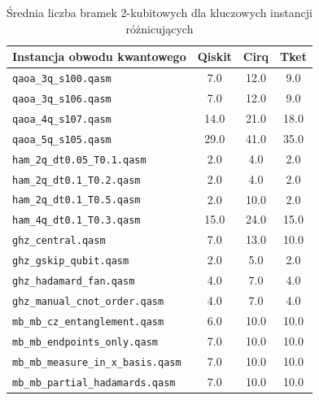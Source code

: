 \begin{table}[t]
    \centering
    \caption{Średnia liczba bramek 2-kubitowych dla kluczowych instancji różnicujących}
    \label{table:anomalies_gate}
    \begin{tabular}{l@{\hspace{8pt}}c@{\hspace{8pt}}c@{\hspace{8pt}}c}
        \toprule
        \textbf{Instancja obwodu kwantowego} & \textbf{Qiskit} & \textbf{Cirq} & \textbf{Tket} \\
        \midrule
        \texttt{qaoa\_3q\_s100.qasm} & {7.0} & {12.0} & {9.0} \\
        \texttt{qaoa\_3q\_s106.qasm} & {7.0} & {12.0} & {9.0} \\
        \texttt{qaoa\_4q\_s107.qasm} & {14.0} & {21.0} & {18.0} \\
        \texttt{qaoa\_5q\_s105.qasm} & {29.0} & {41.0} & {35.0} \\
        \texttt{ham\_2q\_dt0.05\_T0.1.qasm} & {2.0} & {4.0} & {2.0} \\
        \texttt{ham\_2q\_dt0.1\_T0.2.qasm} & {2.0} & {4.0} & {2.0} \\
        \texttt{ham\_2q\_dt0.1\_T0.5.qasm} & {2.0} & {10.0} & {2.0} \\
        \texttt{ham\_4q\_dt0.1\_T0.3.qasm} & {15.0} & {24.0} & {15.0} \\
        \texttt{ghz\_central.qasm} & {7.0} & {13.0} & {10.0} \\
        \texttt{ghz\_gskip\_qubit.qasm} & {2.0} & {5.0} & {2.0} \\
        \texttt{ghz\_hadamard\_fan.qasm} & {4.0} & {7.0} & {4.0} \\
        \texttt{ghz\_manual\_cnot\_order.qasm} & {4.0} & {7.0} & {4.0} \\
        \texttt{mb\_mb\_cz\_entanglement.qasm} & {6.0} & {10.0} & {10.0} \\
        \texttt{mb\_mb\_endpoints\_only.qasm} & {7.0} & {10.0} & {10.0} \\
        \texttt{mb\_mb\_measure\_in\_x\_basis.qasm} & {7.0} & {10.0} & {10.0} \\
        \texttt{mb\_mb\_partial\_hadamards.qasm} & {7.0} & {10.0} & {10.0} \\
        \bottomrule
    \end{tabular}
\end{table}


